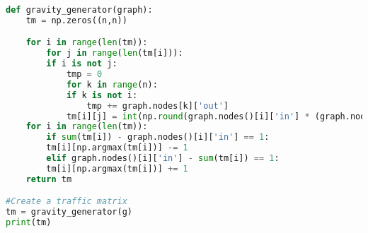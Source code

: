 \begin{lstlisting}[language=python,caption=Gravity Generator Function with Python]
def gravity_generator(graph):
    tm = np.zeros((n,n))

    for i in range(len(tm)):
        for j in range(len(tm[i])):
        if i is not j:
            tmp = 0
            for k in range(n):
            if k is not i:
                tmp += graph.nodes[k]['out']
            tm[i][j] = int(np.round(graph.nodes()[i]['in'] * (graph.nodes[j]['out'] / tmp))) # Slide Page 15
    for i in range(len(tm)):
        if sum(tm[i]) - graph.nodes()[i]['in'] == 1:
        tm[i][np.argmax(tm[i])] -= 1
        elif graph.nodes()[i]['in'] - sum(tm[i]) == 1:
        tm[i][np.argmax(tm[i])] += 1
    return tm

#Create a traffic matrix
tm = gravity_generator(g)
print(tm)
\end{lstlisting}